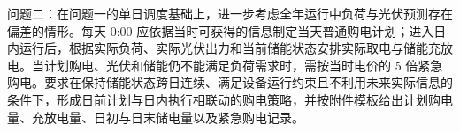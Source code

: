 问题二：在问题一的单日调度基础上，进一步考虑全年运行中负荷与光伏预测存在偏差的情形。每天 0:00 应依据当时可获得的信息制定当天普通购电计划；进入日内运行后，根据实际负荷、实际光伏出力和当前储能状态安排实际取电与储能充放电。当计划购电、光伏和储能仍不能满足负荷需求时，需按当时电价的 5 倍紧急购电。要求在保持储能状态跨日连续、满足设备运行约束且不利用未来实际信息的条件下，形成日前计划与日内执行相联动的购电策略，并按附件模板给出计划购电量、充放电量、日初与日末储电量以及紧急购电记录。
